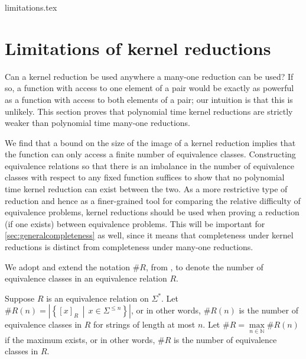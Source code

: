\begin{filecontents}{limitations.tex}
\section{Limitations of kernel reductions}\label{sec:limitations}
%
Can a kernel reduction be used anywhere a many-one reduction can be used?
If so, a function with access to one element of a pair would be exactly as powerful as a function with access to both elements of a pair; our intuition is that this is unlikely.
This section proves that polynomial time kernel reductions are strictly weaker than polynomial time many-one reductions.

%
We find that a bound on the size of the image of a kernel reduction implies that the function can only access a finite number of equivalence classes.
Constructing equivalence relations so that there is an imbalance in the number of equivalence classes with respect to any fixed function suffices to show that no polynomial time kernel reduction can exist between the two.
As a more restrictive type of reduction and hence as a finer-grained tool for comparing the relative difficulty of equivalence problems, kernel reductions should be used when proving a reduction (if one exists) between equivalence problems.
This will be important for \ref{sec:generalcompleteness} as well, since it means that completeness under kernel reductions is distinct from completeness under many-one reductions.

We adopt and extend the notation $\#R$, from \cite{bcffm}, to denote the number of equivalence classes in an equivalence relation $R$.

\begin{definition}%
  Suppose $R$ is an equivalence relation on $\Sigma^*$.
  Let $\#R(n) = \left|\left\{[x]_R \, \middle| \, x \in \Sigma^{\leq n}\right\}\right|$, or in other words, $\#R(n)$ is the number of equivalence classes in $R$ for strings of length at most $n$.
  Let $\#R = \max\limits_{n \in \mathbb{N}} \#R(n)$ if the maximum exists, or in other words, $\#R$ is the number of equivalence classes in $R$.
\end{definition}


\end{filecontents}
